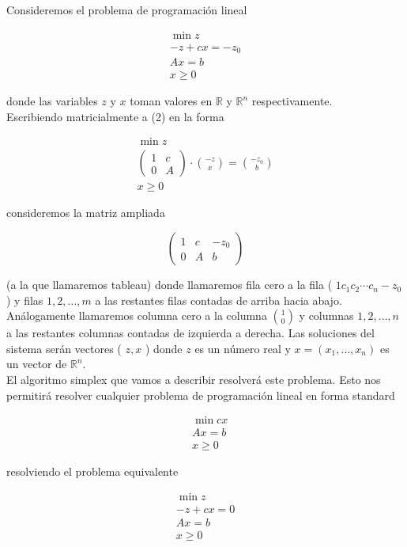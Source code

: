 \documentclass[10pt]{article}
\begin{document}
Consideremos el problema de programación lineal


\begin{gather*}
\min z \\
-z+c x=-z_{0} \\
A x=b  \tag{2}\\
x \geq 0
\end{gather*}


donde las variables $z$ y $x$ toman valores en $\mathbb{R}$ y $\mathbb{R}^{n}$ respectivamente.\\
Escribiendo matricialmente a (2) en la forma

$$
\begin{gathered}
\min z \\
\left(\begin{array}{cc}
1 & c \\
0 & A
\end{array}\right) \cdot\binom{-z}{x}=\binom{-z_{0}}{b} \\
x \geq 0
\end{gathered}
$$

consideremos la matriz ampliada

$$
\left(\begin{array}{cc|c}
1 & c & -z_{0} \\
0 & A & b
\end{array}\right)
$$

(a la que llamaremos tableau) donde llamaremos fila cero a la fila ( $1 c_{1} c_{2} \cdots c_{n}-z_{0}$ ) y filas $1,2, \ldots, m$ a las restantes filas contadas de arriba hacia abajo. Análogamente llamaremos columna cero a la columna $\binom{1}{0}$ y columnas $1,2, \ldots, n$ a las restantes columnas contadas de izquierda a derecha. Las soluciones del sistema serán vectores ( $z, x$ ) donde $z$ es un número real y $x=\left(x_{1}, \ldots, x_{n}\right)$ es un vector de $\mathbb{R}^{n}$.\\
El algoritmo simplex que vamos a describir resolverá este problema. Esto nos permitirá resolver cualquier problema de programación lineal en forma standard

$$
\begin{aligned}
& \min c x \\
& A x=b \\
& x \geq 0
\end{aligned}
$$

resolviendo el problema equivalente

$$
\begin{gathered}
\min z \\
-z+c x=0 \\
A x=b \\
x \geq 0
\end{gathered}
$$
\end{document}

